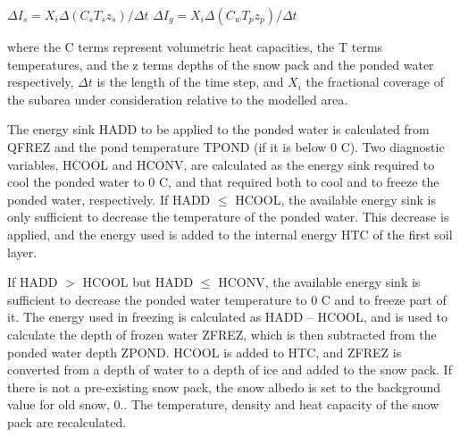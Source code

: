 $\Delta I_s = X_i \Delta(C_s T_s z_s) / \Delta t$ $\Delta I_g = X_i \Delta(C_w T_p z_p)/\Delta t$

where the C terms represent volumetric heat capacities, the T terms temperatures, and the z terms depths of the snow pack and the ponded water respectively, $\Delta t$ is the length of the time step, and $X_i$ the fractional coverage of the subarea under consideration relative to the modelled area.

The energy sink H\+A\+D\+D to be applied to the ponded water is calculated from Q\+F\+R\+E\+Z and the pond temperature T\+P\+O\+N\+D (if it is below 0 C). Two diagnostic variables, H\+C\+O\+O\+L and H\+C\+O\+N\+V, are calculated as the energy sink required to cool the ponded water to 0 C, and that required both to cool and to freeze the ponded water, respectively. If H\+A\+D\+D $\leq$ H\+C\+O\+O\+L, the available energy sink is only sufficient to decrease the temperature of the ponded water. This decrease is applied, and the energy used is added to the internal energy H\+T\+C of the first soil layer.

If H\+A\+D\+D $>$ H\+C\+O\+O\+L but H\+A\+D\+D $\leq$ H\+C\+O\+N\+V, the available energy sink is sufficient to decrease the ponded water temperature to 0 C and to freeze part of it. The energy used in freezing is calculated as H\+A\+D\+D – H\+C\+O\+O\+L, and is used to calculate the depth of frozen water Z\+F\+R\+E\+Z, which is then subtracted from the ponded water depth Z\+P\+O\+N\+D. H\+C\+O\+O\+L is added to H\+T\+C, and Z\+F\+R\+E\+Z is converted from a depth of water to a depth of ice and added to the snow pack. If there is not a pre-\/existing snow pack, the snow albedo is set to the background value for old snow, 0.. The temperature, density and heat capacity of the snow pack are recalculated.


